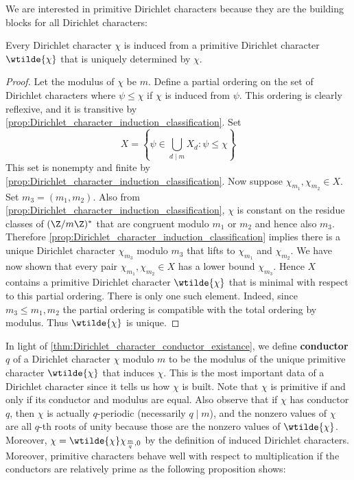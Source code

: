       We are interested in primitive Dirichlet characters because they are the building blocks for all Dirichlet characters:

      \begin{theorem}\label{thm:Dirichlet_character_conductor_existance}
        Every Dirichlet character $\chi$ is induced from a primitive Dirichlet character $\wtilde{\chi}$ that is uniquely determined by $\chi$.
      \end{theorem}
      \begin{proof}
        Let the modulus of $\chi$ be $m$. Define a partial ordering on the set of Dirichlet characters where $\psi \le \chi$ if $\chi$ is induced from $\psi$. This ordering is clearly reflexive, and it is transitive by \cref{prop:Dirichlet_character_induction_classification}. Set
        \[
          X = \left\{\psi \in \bigcup_{d \mid m}X_{d}:\psi \le \chi\right\}
        \]
        This set is nonempty and finite by \cref{prop:Dirichlet_character_induction_classification}. Now suppose $\chi_{m_{1}},\chi_{m_{2}} \in X$. Set $m_{3} = (m_{1},m_{2})$. Also from \cref{prop:Dirichlet_character_induction_classification}, $\chi$ is constant on the residue classes of $(\Z/m\Z)^{\ast}$ that are congruent modulo $m_{1}$ or $m_{2}$ and hence also $m_{3}$. Therefore \cref{prop:Dirichlet_character_induction_classification} implies there is a unique Dirichlet character $\chi_{m_{3}}$ modulo $m_{3}$ that lifts to $\chi_{m_{1}}$ and $\chi_{m_{2}}$. We have now shown that every pair $\chi_{m_{1}},\chi_{m_{2}} \in X$ has a lower bound $\chi_{m_{3}}$. Hence $X$ contains a primitive Dirichlet character $\wtilde{\chi}$ that is minimal with respect to this partial ordering. There is only one such element. Indeed, since $m_{3} \le m_{1},m_{2}$ the partial ordering is compatible with the total ordering by modulus. Thus $\wtilde{\chi}$ is unique.
      \end{proof}

      In light of \cref{thm:Dirichlet_character_conductor_existance}, we define \textbf{conductor} $q$ of a Dirichlet character $\chi$ modulo $m$ to be the modulus of the unique primitive character $\wtilde{\chi}$ that induces $\chi$. This is the most important data of a Dirichlet character since it tells us how $\chi$ is built. Note that $\chi$ is primitive if and only if its conductor and modulus are equal. Also observe that if $\chi$ has conductor $q$, then $\chi$ is actually $q$-periodic (necessarily $q \mid m$), and the nonzero values of $\chi$ are all $q$-th roots of unity because those are the nonzero values of $\wtilde{\chi}$. Moreover, $\chi = \wtilde{\chi}\chi_{\frac{m}{q},0}$ by the definition of induced Dirichlet characters. Moreover, primitive characters behave well with respect to multiplication if the conductors are relatively prime as the following proposition shows:

